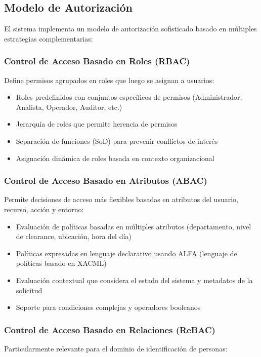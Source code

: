 \documentclass[12pt,a4paper]{article}
\begin{document}
\subsection{Modelo de Autorización}
\label{subsec:as-autorizacion}

El sistema implementa un modelo de autorización sofisticado basado en múltiples estrategias complementarias:

\subsubsection{Control de Acceso Basado en Roles (RBAC)}
Define permisos agrupados en roles que luego se asignan a usuarios:

\begin{itemize}
    \item Roles predefinidos con conjuntos específicos de permisos (Administrador, Analista, Operador, Auditor, etc.)
    \item Jerarquía de roles que permite herencia de permisos
    \item Separación de funciones (SoD) para prevenir conflictos de interés
    \item Asignación dinámica de roles basada en contexto organizacional
\end{itemize}

\subsubsection{Control de Acceso Basado en Atributos (ABAC)}
Permite decisiones de acceso más flexibles basadas en atributos del usuario, recurso, acción y entorno:

\begin{itemize}
    \item Evaluación de políticas basadas en múltiples atributos (departamento, nivel de clearance, ubicación, hora del día)
    \item Políticas expresadas en lenguaje declarativo usando ALFA (lenguaje de políticas basado en XACML)
    \item Evaluación contextual que considera el estado del sistema y metadatos de la solicitud
    \item Soporte para condiciones complejas y operadores booleanos
\end{itemize}

\subsubsection{Control de Acceso Basado en Relaciones (ReBAC)}
Particularmente relevante para el dominio de identificación de personas:
\end{document}
